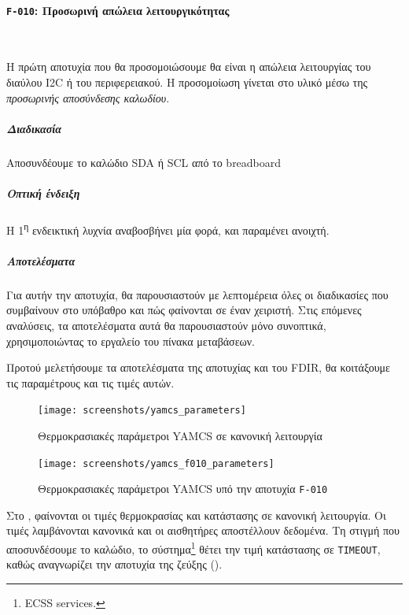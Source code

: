\documentclass[a4paper,nobib]{tufte-book}
\begin{document}
\FloatBarrier

\paragraph{\textbf{\texttt{F-010}: Προσωρινή απώλεια λειτουργικότητας}}~

Η πρώτη αποτυχία που θα προσομοιώσουμε θα είναι η απώλεια λειτουργίας του διαύλου \acs{I2C} ή του περιφερειακού. Η προσομοίωση γίνεται στο υλικό μέσω της \emph{προσωρινής αποσύνδεσης καλωδίου}.

\subparagraph{Διαδικασία} 
\begin{compactenum}
	\item Αποσυνδέουμε το καλώδιο \acs{SDA} ή \acs{SCL} από το breadboard
	\item {}
\end{compactenum}

\subparagraph{Οπτική ένδειξη} Η 1\textsuperscript{η} ενδεικτική λυχνία αναβοσβήνει μία φορά, και παραμένει ανοιχτή.

\subparagraph{Αποτελέσματα}
Για αυτήν την αποτυχία, θα παρουσιαστούν με λεπτομέρεια όλες οι διαδικασίες που συμβαίνουν στο υπόβαθρο και πώς φαίνονται σε έναν χειριστή. Στις επόμενες αναλύσεις, τα αποτελέσματα αυτά θα παρουσιαστούν μόνο συνοπτικά, χρησιμοποιώντας το εργαλείο του πίνακα μεταβάσεων.

Προτού μελετήσουμε τα αποτελέσματα της αποτυχίας και του \acs{FDIR}, θα κοιτάξουμε τις παραμέτρους και τις τιμές αυτών.

\begin{figure}[h]
	\centering
	\texttt{[image: screenshots/yamcs\_parameters]}
	\caption{Θερμοκρασιακές παράμετροι \acs{YAMCS} σε κανονική λειτουργία}
	\label{fig:yamcsparametersnominal}
\end{figure}

\begin{figure}[h]
	\centering
	\texttt{[image: screenshots/yamcs\_f010\_parameters]}
	\caption{Θερμοκρασιακές παράμετροι \acs{YAMCS} υπό την αποτυχία \texttt{F-010}}
	\label{fig:yamcsparametersf010}
\end{figure}

Στο , φαίνονται οι τιμές θερμοκρασίας και κατάστασης σε κανονική λειτουργία. Οι τιμές λαμβάνονται κανονικά και οι αισθητήρες αποστέλλουν δεδομένα. Τη στιγμή που αποσυνδέσουμε το καλώδιο, το σύστημα\footnote{ \acs{ECSS} services.} θέτει την τιμή κατάστασης σε \texttt{TIMEOUT}, καθώς αναγνωρίζει την αποτυχία της ζεύξης (). 
\end{document}
